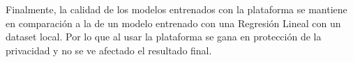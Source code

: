 \documentclass[
11pt, %
oneside, %
spanish, %
singlespacing, %
parskip, %
headsepline, %
chapterinoneline, %
]{MastersDoctoralThesis} %
\begin{document}
Finalmente, la calidad de los modelos entrenados con la plataforma se mantiene en comparación a la de un modelo entrenado con una Regresión Lineal con un dataset local. Por lo que al usar la plataforma se gana en protección de la privacidad y no se ve afectado el resultado final.



\printbibliography[heading=bibnumbered, title=Referencias]

\end{document}
